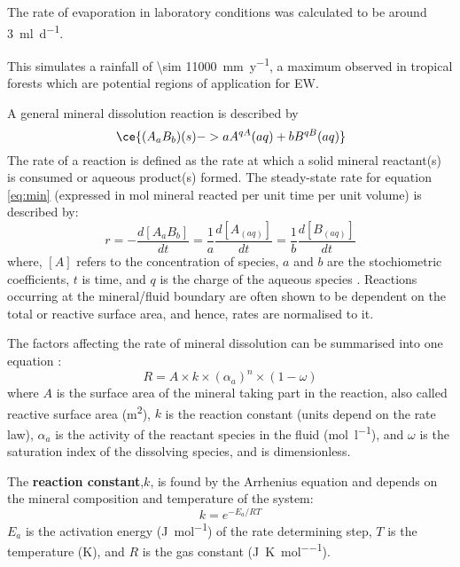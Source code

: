The rate of evaporation in laboratory conditions was calculated to be around \SI{3}{\milli\litre\per\day}. 

This simulates a rainfall of \SI{\sim 11000}{mm.y^{-1}}, a maximum observed in tropical forests which are potential regions of application for EW. 

A general mineral dissolution reaction is described by 
\begin{equation} \label{eq:min}
\ce{(A_aB_b)(s) -> aA^{qA}(aq) + bB^{qB}(aq)}
\end{equation}
The rate of a reaction is defined as the rate at which a solid mineral reactant(s) is consumed or aqueous product(s) formed. The steady-state rate for equation \ref{eq:min} (expressed in mol mineral reacted per unit time per unit volume) is described by:
\begin{equation}\label{eq:rate}
r=-\frac{d[A_aB_b]}{dt}=\frac{\text{1}}{a}\frac{d[A_{(aq)}]}{dt}=\frac{\text{1}}{b}\frac{d[B_{(aq)}]}{dt}
\end{equation}
where, $[A]$ refers to the concentration of species, $a$ and $b$ are the stochiometric coefficients, $t$ is time, and $q$ is the charge of the aqueous species \citep{Brantley2008b}. 
Reactions occurring at the mineral/fluid boundary are often shown to be dependent on the total or reactive surface area, and hence, rates are normalised to it. 

The factors affecting the rate of mineral dissolution can be summarised into one equation \citep{renforth2015}:
\begin{equation}
R= A \times k \times(\alpha_a)^{n}\times(\text{1}-\omega)
\end{equation}
where $A$ is the surface area of the mineral taking part in the reaction, also called reactive surface area (\si{\square\metre}), $k$ is the reaction constant (units depend on the rate law), $\alpha_a$ is the activity of the reactant species in the fluid (\si{\mole\per\litre}), and  $\omega$ is the saturation index of the dissolving species, and is dimensionless.

\noindent The \textbf{reaction constant},$k$, is found by the Arrhenius equation and depends on the mineral composition and temperature of the system:
\begin{equation}
k=e^{-E_a/RT}
\end{equation}
$E_a$ is the activation energy (\si{\joule\per\mole}) of the rate determining step, $T$ is the temperature (K), and $R$ is the gas constant (\si{\joule\per\kelvin\per\mole}). 

